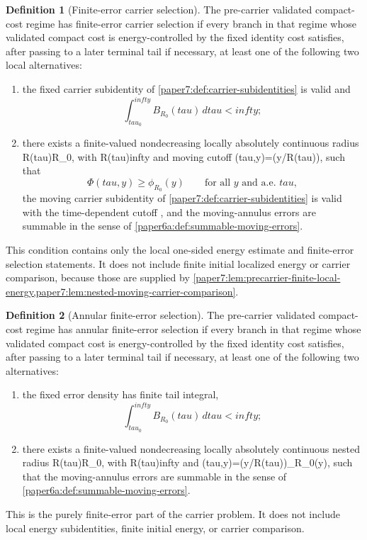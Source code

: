 \documentclass[11pt]{amsart}
\def\({}%
\def\){}%
\def\tau{tau}%
\def\infty{infty}%
\theoremstyle{plain}
\theoremstyle{definition}
\newtheorem{definition}[definition]{Definition}
\theoremstyle{remark}
\begin{document}
\begin{definition}[Finite-error carrier selection]
\label{paper7:def:finite-error-carrier-selection}
The pre-carrier validated compact-cost regime has finite-error carrier
selection if every branch in that regime whose validated compact cost is
energy-controlled by the fixed identity cost satisfies, after passing to a
later terminal tail if necessary, at least one of the following two local
alternatives:
\begin{enumerate}[label=\textup{(\roman*)}]
\item the fixed carrier subidentity of
\cref{paper7:def:carrier-subidentities} is valid and
\[
  \int_{\tau_0}^{\infty}B_{R_0}(\tau)\,d\tau<\infty ;
\]
\item there exists a finite-valued nondecreasing locally absolutely continuous
radius \(R(\tau)\ge R_0\), with \(R(\tau)\to\infty\) and moving cutoff
\(\Phi(\tau,y)=\phi(y/R(\tau))\), such that
\[
  \Phi(\tau,y)\ge\phi_{R_0}(y)
  \qquad\text{for all }y\text{ and a.e. }\tau,
\]
the moving carrier subidentity of
\cref{paper7:def:carrier-subidentities} is valid with the time-dependent cutoff
\(\Phi\), and the moving-annulus errors are summable in the sense of
\cref{paper6a:def:summable-moving-errors}.
\end{enumerate}
This condition contains only the local one-sided energy estimate and finite-error
selection statements.  It does not include finite initial localized energy or
carrier comparison, because those are supplied by
\cref{paper7:lem:precarrier-finite-local-energy,paper7:lem:nested-moving-carrier-comparison}.
\end{definition}

\begin{definition}[Annular finite-error selection]
\label{paper7:def:annular-finite-error-selection}
The pre-carrier validated compact-cost regime has annular finite-error
selection if every branch in that regime whose validated compact cost is
energy-controlled by the fixed identity cost satisfies, after passing to a
later terminal tail if necessary, at least one of the following two alternatives:
\begin{enumerate}[label=\textup{(\roman*)}]
\item the fixed error density has finite tail integral,
\[
  \int_{\tau_0}^{\infty}B_{R_0}(\tau)\,d\tau<\infty;
\]
\item there exists a finite-valued nondecreasing locally absolutely continuous
nested radius \(R(\tau)\ge R_0\), with \(R(\tau)\to\infty\) and
\(\Phi(\tau,y)=\phi(y/R(\tau))\ge\phi_{R_0}(y)\), such that the moving-annulus
errors are summable in the sense of
\cref{paper6a:def:summable-moving-errors}.
\end{enumerate}
This is the purely finite-error part of the carrier problem.  It does not
include local energy subidentities, finite initial energy, or carrier comparison.
\end{definition}
\end{document}
